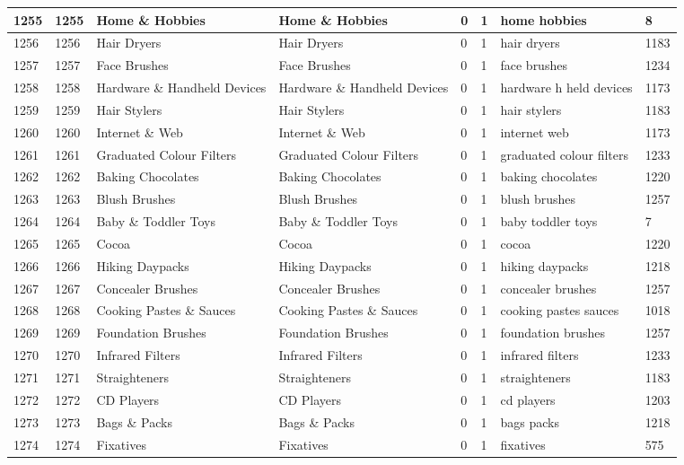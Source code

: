 \begin{longtable}{|l|l|l|l|l|l|l|l|}
1255 & 1255 & Home \& Hobbies & Home \& Hobbies & 0 & 1 & home hobbies & 8 \\ \hline 
1256 & 1256 & Hair Dryers & Hair Dryers & 0 & 1 & hair dryers & 1183 \\ \hline 
1257 & 1257 & Face Brushes & Face Brushes & 0 & 1 & face brushes & 1234 \\ \hline 
1258 & 1258 & Hardware \& Handheld Devices & Hardware \& Handheld Devices & 0 & 1 & hardware h held devices & 1173 \\ \hline 
1259 & 1259 & Hair Stylers & Hair Stylers & 0 & 1 & hair stylers & 1183 \\ \hline 
1260 & 1260 & Internet \& Web & Internet \& Web & 0 & 1 & internet web & 1173 \\ \hline 
1261 & 1261 & Graduated Colour Filters & Graduated Colour Filters & 0 & 1 & graduated colour filters & 1233 \\ \hline 
1262 & 1262 & Baking Chocolates & Baking Chocolates & 0 & 1 & baking chocolates & 1220 \\ \hline 
1263 & 1263 & Blush Brushes & Blush Brushes & 0 & 1 & blush brushes & 1257 \\ \hline 
1264 & 1264 & Baby \& Toddler Toys & Baby \& Toddler Toys & 0 & 1 & baby toddler toys & 7 \\ \hline 
1265 & 1265 & Cocoa & Cocoa & 0 & 1 & cocoa & 1220 \\ \hline 
1266 & 1266 & Hiking Daypacks & Hiking Daypacks & 0 & 1 & hiking daypacks & 1218 \\ \hline 
1267 & 1267 & Concealer Brushes & Concealer Brushes & 0 & 1 & concealer brushes & 1257 \\ \hline 
1268 & 1268 & Cooking Pastes \& Sauces & Cooking Pastes \& Sauces & 0 & 1 & cooking pastes sauces & 1018 \\ \hline 
1269 & 1269 & Foundation Brushes & Foundation Brushes & 0 & 1 & foundation brushes & 1257 \\ \hline 
1270 & 1270 & Infrared Filters & Infrared Filters & 0 & 1 & infrared filters & 1233 \\ \hline 
1271 & 1271 & Straighteners & Straighteners & 0 & 1 & straighteners & 1183 \\ \hline 
1272 & 1272 & CD Players & CD Players & 0 & 1 & cd players & 1203 \\ \hline 
1273 & 1273 & Bags \& Packs & Bags \& Packs & 0 & 1 & bags packs & 1218 \\ \hline 
1274 & 1274 & Fixatives & Fixatives & 0 & 1 & fixatives & 575 \\ \hline 

\end{longtable}
